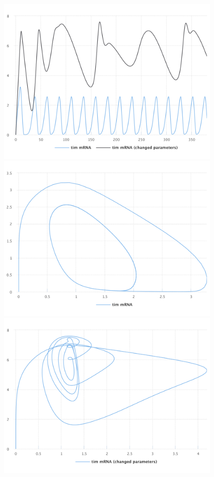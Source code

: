 \begin{figure}[ht]
    \centering
    \begin{minipage}{0.47\textwidth}
        \centering
        \includegraphics[width=1.0\textwidth]{examples/leloup-sbml/results/sedml_webtools/plot1}
		\includegraphics[width=1.0\textwidth]{examples/leloup-sbml/results/sedml_webtools/plot2}
		\includegraphics[width=1.0\textwidth]{examples/leloup-sbml/results/sedml_webtools/plot3}

\end{minipage}
\end{figure}
